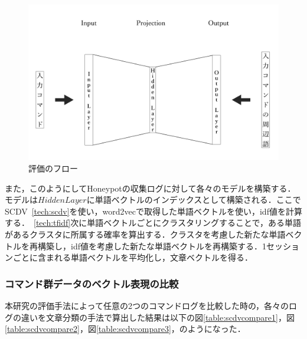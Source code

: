 \vspace{10mm}
\begin{figure}[htbp]
    \centering
    \includegraphics[width=1.0\textwidth]{figures/model.png}
    \caption{評価のフロー\cite{word2vecpaper}\cite{word2vecpaper2}}
    \label{fig:hyoukaflow}
\end{figure}
\vspace{10mm}

また，このようにしてHoneypotの収集ログに対して各々のモデルを構築する．モデルは$ Hidden Layer $に単語ベクトルのインデックスとして構築される．ここでSCDV~\ref{tech:scdv}を使い，word2vecで取得した単語ベクトルを使い，idf値を計算する．~\ref{tech:tfidf}次に単語ベクトルごとにクラスタリングすることで，ある単語があるクラスタに所属する確率を算出する．クラスタを考慮した新たな単語ベクトルを再構築し，idf値を考慮した新たな単語ベクトルを再構築する．1セッションごとに含まれる単語ベクトルを平均化し，文章ベクトルを得る．\\



\subsubsection{コマンド群データのベクトル表現の比較}
\label{eval:CommandVector}
本研究の評価手法によって任意の2つのコマンドログを比較した時の，各々のログの違いを文章分類の手法で算出した結果は以下の図\ref{table:scdvcompare1}，図\ref{table:scdvcompare2}，図\ref{table:scdvcompare3}，のようになった．
\clearpage

